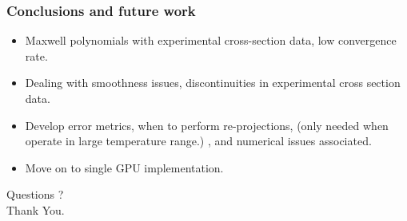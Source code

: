 \documentclass[mathserif, aspectratio=169]{beamer}
\begin{document}
	\begin{frame}
		\frametitle{Conclusions and future work}
		\begin{itemize}
			\item Maxwell polynomials with experimental cross-section data, low convergence rate. 
			\item Dealing with smoothness issues, discontinuities in experimental cross section data. 
			\item Develop error metrics, when to perform re-projections, (only needed when operate in large temperature range.) , and numerical issues associated.
			\item Move on to single GPU implementation.
		\end{itemize}
		\pause
		\begin{center}
			\Large Questions ? \\
			\Large Thank You. 
		\end{center}
	\end{frame}
\end{document}
